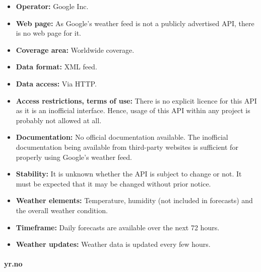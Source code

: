 \begin{itemize}
  \item \textbf{Operator:} Google Inc.
  \item \textbf{Web page:} As Google's weather feed is not a publicly advertised API, there is no web page for it.
  \item \textbf{Coverage area:} Worldwide coverage.
  \item \textbf{Data format:} XML feed.
  \item \textbf{Data access:} Via HTTP.
  \item \textbf{Access restrictions, terms of use:} There is no explicit licence for this API as it is an inofficial interface. Hence, usage of this API within any project is probably not allowed at all.
  \item \textbf{Documentation:} No official documentation available. The inofficial documentation being available from third-party websites is sufficient for properly using Google's weather feed.
  \item \textbf{Stability:} It is unknown whether the API is subject to change or not. It must be expected that it may be changed without prior notice.
  \item \textbf{Weather elements:} Temperature, humidity (not included in forecasts) and the overall weather condition.
  \item \textbf{Timeframe:} Daily forecasts are available over the next 72 hours.
  \item \textbf{Weather updates:} Weather data is updated every few hours.
\end{itemize}

\paragraph{yr.no}

